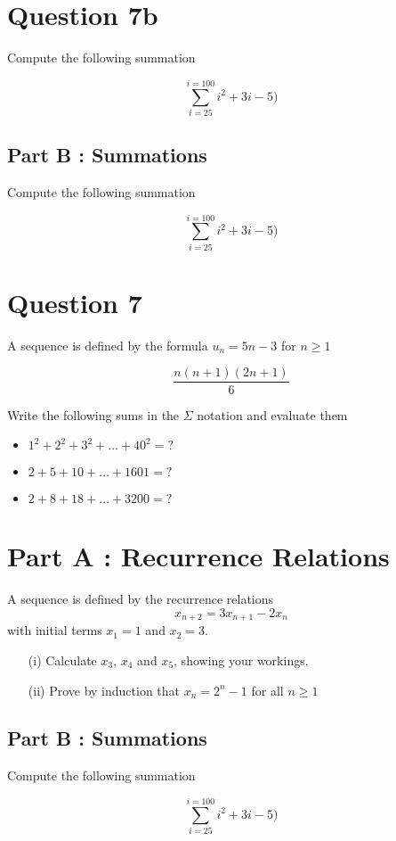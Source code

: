 



\section*{Question 7b}

Compute the following summation

\[ \sum^{i=100}_{i=25} i^2 + 3i -5)\]

\subsection*{Part B : Summations}

Compute the following summation

\[ \sum^{i=100}_{i=25} i^2 + 3i -5)\]


\section*{Question 7}
A sequence is defined by the formula 
$u_n = 5n-3$ for $n\geq 1$

\[\frac{n(n+1)(2n+1)}{6}\]

Write the following sums in the $\Sigma$ notation and evaluate them

\begin{itemize}
\item $1^2 + 2^2 + 3^2 +  \ldots +  40^2 = ?$
\item $2 + 5 + 10 + \ldots + 1601 = ?$
\item $2+8+18+\ldots +3200 = ?$
\end{itemize}

\section*{Part A : Recurrence Relations}
A sequence is defined by the recurrence relations
\[x_{n+2}  = 3x_{n+1} - 2x_n\]
with initial terms $x_1 = 1$ and $x_2=3$.

\begin{itemize}
\item[(i)] Calculate $x_3$, $x_4$ and $x_5$, showing your workings.
\item[(ii)] Prove by induction that $x_n = 2^n - 1$ for all $n \geq 1$
\end{itemize}


\subsection*{Part B : Summations}

Compute the following summation

\[ \sum^{i=100}_{i=25} i^2 + 3i -5)\]
